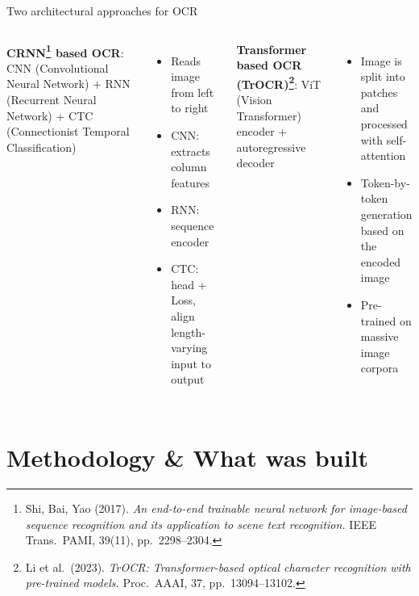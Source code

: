 \documentclass[aspectratio=169,11pt]{beamer}
\begin{document}
\begin{frame}{Two architectural approaches for OCR}
  \begin{columns}[T,onlytextwidth]
    \textbf{CRNN\footnote[frame]{\tiny Shi, Bai, Yao (2017). \emph{An end-to-end trainable neural network for image-based sequence recognition and its application to scene text recognition.} IEEE Trans.\ PAMI, 39(11), pp.\ 2298--2304.} based OCR}:
     CNN (Convolutional Neural Network) + RNN (Recurrent Neural Network) + CTC (Connectionist Temporal Classification)
    \begin{itemize}
      \item Reads image from left to right
      \item CNN: extracts column features
      \item RNN: sequence encoder
      \item CTC: head + Loss, align length-varying input to output
    \end{itemize}
    \textbf{Transformer based OCR (TrOCR)\footnote[frame]{\tiny Li et al.\ (2023). \emph{TrOCR: Transformer-based optical character recognition with pre-trained models.} Proc.\ AAAI, 37, pp.\ 13094--13102.}}:
    ViT (Vision Transformer) encoder + autoregressive decoder
    \begin{itemize}
      \item Image is split into patches and processed with self-attention
      \item Token-by-token generation based on the encoded image
      \item Pre-trained on massive image corpora
    \end{itemize}
  \end{columns}
  \vspace{1em}
  \centering
\end{frame}

\section{Methodology \& What was built}
\end{document}
